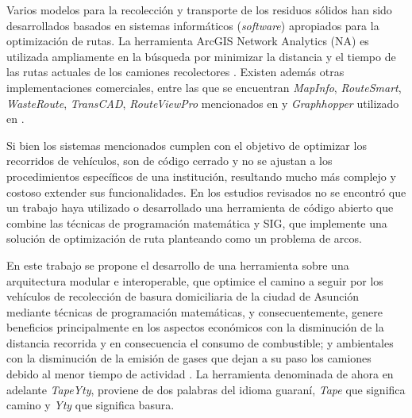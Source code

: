
Varios modelos para la recolección y transporte de los residuos sólidos han sido desarrollados basados en sistemas informáticos (\textit{software}) apropiados para la optimización de rutas. La herramienta ArcGIS Network Analytics (NA) es utilizada ampliamente en la búsqueda por minimizar la distancia y el tiempo de las rutas actuales de los camiones recolectores \citep{Kallel2016UsingTunisia,Malakahmad2014SolidMalaysia}. Existen además otras implementaciones comerciales, entre las que se encuentran \textit{MapInfo}, \textit{RouteSmart}, \textit{WasteRoute}, \textit{TransCAD}, \textit{RouteViewPro} mencionados en \citet{Kallel2016UsingTunisia} y \textit{Graphhopper} utilizado en \citet{Lozano2018SmartOptimization}.

Si bien los sistemas mencionados cumplen con el objetivo de optimizar los recorridos de vehículos, son de código cerrado y no se ajustan a los procedimientos específicos de una institución, resultando mucho más complejo y costoso extender sus funcionalidades. En los estudios revisados no se encontró que un trabajo haya utilizado o desarrollado una herramienta de código abierto que combine las técnicas de programación matemática y SIG, que implemente una solución de optimización de ruta planteando como un problema de arcos. 

En este trabajo se propone el desarrollo de una herramienta sobre una arquitectura modular e interoperable, que optimice el camino a seguir por los vehículos de recolección de basura domiciliaria de la ciudad de Asunción mediante técnicas de programación matemáticas, y consecuentemente, genere beneficios principalmente en los aspectos económicos con la disminución de la distancia recorrida y en consecuencia el consumo de combustible; y ambientales con la disminución de la emisión de gases que dejan a su paso los camiones debido al menor tiempo de actividad \citep{Vu2018ParameterModel}. La herramienta denominada de ahora en adelante \textit{TapeYty}, proviene de dos palabras del idioma guaraní, \textit{Tape} que significa camino y \textit{Yty} que significa basura.

